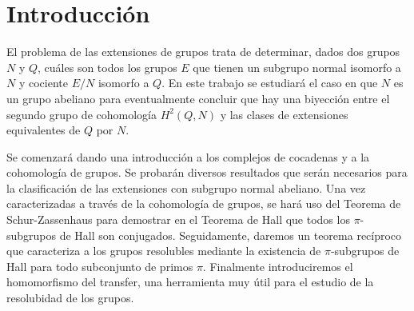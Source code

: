 
\chapter{Introducción}

El problema de las extensiones de grupos trata de determinar, dados dos grupos $N$ y $Q$, cuáles son todos los grupos $E$ que tienen un subgrupo normal isomorfo a $N$ y cociente $E/N$ isomorfo a $Q$. En este trabajo se estudiará el caso en que $N$ es un grupo abeliano para eventualmente concluir que hay una biyección entre el segundo grupo de cohomología $H^2(Q,N)$ y las clases de extensiones equivalentes de $Q$ por $N$.



Se comenzará dando una introducción a los complejos de cocadenas y a la cohomología de grupos. Se probarán diversos resultados que serán necesarios para la clasificación de las extensiones con subgrupo normal abeliano. Una vez caracterizadas a través de la cohomología de grupos, se hará uso del Teorema de Schur-Zassenhaus para demostrar en el Teorema de Hall que todos los $\pi$-subgrupos de Hall son conjugados. Seguidamente, daremos un teorema recíproco que caracteriza a los grupos resolubles mediante la existencia de $\pi$-subgrupos de Hall para todo subconjunto de primos $\pi$. Finalmente introduciremos el homomorfismo del transfer, una herramienta muy útil para el estudio de la resolubidad de los grupos.